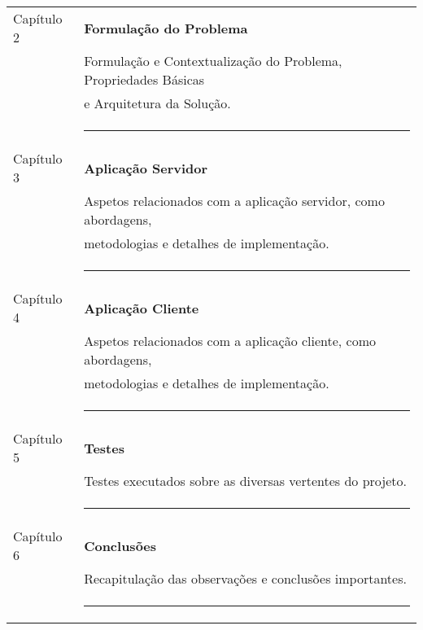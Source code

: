 \begin{tabular}{ll}
	Capítulo 2 & {\bf Formulação do Problema} \\
	& Formulação e Contextualização do Problema, Propriedades Básicas \\
	& e Arquitetura da Solução.\\
	&\rule{75mm}{0.5pt}\\
	Capítulo 3 & {\bf Aplicação Servidor} \\
	& Aspetos relacionados com a aplicação servidor, como abordagens, \\
	& metodologias e detalhes de implementação.\\
	&\rule{75mm}{0.5pt}\\
	Capítulo 4 & {\bf Aplicação Cliente} \\
	& Aspetos relacionados com a aplicação cliente, como abordagens, \\
	&metodologias e detalhes de implementação.\\
	&\rule{75mm}{0.5pt}\\
	Capítulo 5 & {\bf Testes} \\
	& Testes executados sobre as diversas vertentes do projeto.\\
	&\rule{75mm}{0.5pt}\\
	Capítulo 6 & {\bf Conclusões} \\
	& Recapitulação das observações e conclusões importantes.\\
	&\rule{75mm}{0.5pt}\\
\end{tabular}
